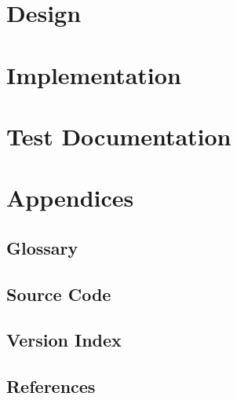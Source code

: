 \documentclass[12pt,a4paper]{article}
\begin{document}
  \section{Design}
    \subsection{}
      \lipsum[15-20]
    \clearpage

  \section{Implementation}
    \subsection{}
      \lipsum[15-20]
    \clearpage

  \section{Test Documentation}
    \subsection{}
      \lipsum[15-20]
    \clearpage

  \section{Appendices}
    \renewcommand{\thepage}{A.\arabic{page}}%
    \subsection{Glossary}
      \lipsum[1-5]
    \clearpage
    \renewcommand{\thepage}{B.\arabic{page}}%
    \subsection{Source Code}
      \lipsum[1-5]
    \clearpage
    \renewcommand{\thepage}{C.\arabic{page}}%
    \subsection{Version Index}
      \lipsum[1-5]
    \clearpage
    \renewcommand{\thepage}{D.\arabic{page}}%
    \subsection{References}
      \lipsum[1-15]
    \clearpage
\end{document}
